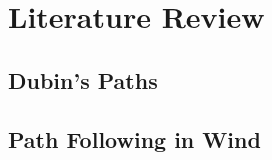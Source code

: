 
\chapter{Literature Review}

\ifpdf
    \graphicspath{{Chapter2/Figs/Raster/}{Chapter2/Figs/PDF/}{Chapter2/Figs/}}
\else
    \graphicspath{{Chapter2/Figs/Vector/}{Chapter2/Figs/}}
\fi

\section{Dubin's Paths}



\section{Path Following in Wind}
